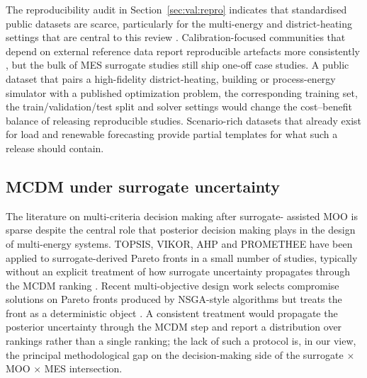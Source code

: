 The reproducibility audit in Section~\ref{sec:val:repro} indicates
that standardised public datasets are scarce, particularly for the
multi-energy and district-heating settings that are central to
this review
\cite{Khaloie2025,Lim2025,Starke2025214,Ruan2021221,Mylonopoulos202332697,Perera2019191,Schulte2016104,Chaudhry2024,Bianchi2020244}.
Calibration-focused communities that depend on external reference
data report reproducible artefacts more consistently
\cite{Azevedo2021630,Khazeiynasab2021,Zhang2025__7,Ullah20255970}, but
the bulk of MES surrogate studies still ship one-off case studies. A
public dataset that pairs a high-fidelity district-heating, building
or process-energy simulator with a published optimization problem,
the corresponding training set, the train/validation/test split and
solver settings would change the cost--benefit balance of releasing
reproducible studies. Scenario-rich datasets that already exist for
load and renewable forecasting
\cite{Eseye201991463,Faraji2020157284,Hanifi2024,Sideratos2020,Tian2020,Madhukumar20228891}
provide partial templates for what such a release should contain.

\subsection{MCDM under surrogate uncertainty}
\label{sec:ch:mcdm}

The literature on multi-criteria decision making after surrogate-
assisted MOO is sparse despite the central role that posterior
decision making plays in the design of multi-energy systems. TOPSIS,
VIKOR, AHP and PROMETHEE have been applied to surrogate-derived Pareto
fronts in a small number of studies, typically without an explicit
treatment of how surrogate uncertainty propagates through the MCDM
ranking \cite{Roy2020,Roy2023}. Recent multi-objective design work
selects compromise solutions on Pareto fronts produced by NSGA-style
algorithms but treats the front as a deterministic object
\cite{Hussien202415075,Liang2024__3,Hussien202190577,Dong2024,Salahinezhad2025,Cao2017,Zang2023813,Reis2025,Katkar2025,Guan2025,bian_multi-energy_2025,chen_multi-objective_2025-1,cortes-caicedo_multi-objective_2025,tezer_multi-objective_2025,tian_building_2025}.
A consistent treatment would propagate the posterior uncertainty
through the MCDM step and report a distribution over rankings rather
than a single ranking; the lack of such a protocol is, in our view,
the principal methodological gap on the decision-making side of the
surrogate $\times$ MOO $\times$ MES intersection.


